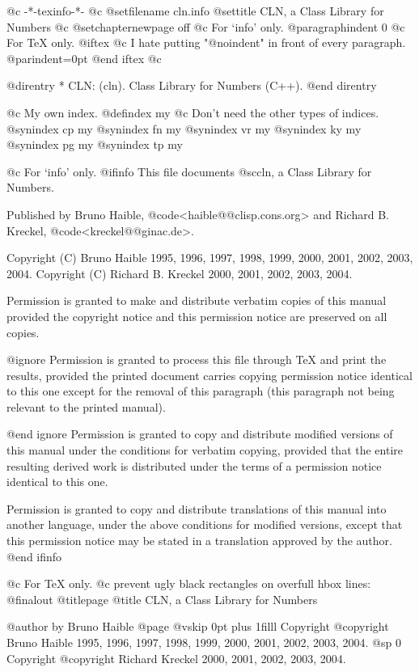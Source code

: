   @c -*-texinfo-*-
@c %
@setfilename cln.info
@settitle CLN, a Class Library for Numbers
@c @setchapternewpage off
@c For `info' only.
@paragraphindent 0
@c For TeX only.
@iftex
@c I hate putting "@noindent" in front of every paragraph.
@parindent=0pt
@end iftex
@c %

@direntry
* CLN: (cln).                       Class Library for Numbers (C++).
@end direntry

@c My own index.
@defindex my
@c Don't need the other types of indices.
@synindex cp my
@synindex fn my
@synindex vr my
@synindex ky my
@synindex pg my
@synindex tp my


@c For `info' only.
@ifinfo
This file documents @sc{cln}, a Class Library for Numbers.

Published by Bruno Haible, @code{<haible@@clisp.cons.org>} and
Richard B. Kreckel, @code{<kreckel@@ginac.de>}.

Copyright (C)  Bruno Haible 1995, 1996, 1997, 1998, 1999, 2000, 2001, 2002, 2003, 2004.
Copyright (C)  Richard B. Kreckel 2000, 2001, 2002, 2003, 2004.

Permission is granted to make and distribute verbatim copies of
this manual provided the copyright notice and this permission notice
are preserved on all copies.

@ignore
Permission is granted to process this file through TeX and print the
results, provided the printed document carries copying permission
notice identical to this one except for the removal of this paragraph
(this paragraph not being relevant to the printed manual).

@end ignore
Permission is granted to copy and distribute modified versions of this
manual under the conditions for verbatim copying, provided that the entire
resulting derived work is distributed under the terms of a permission
notice identical to this one.

Permission is granted to copy and distribute translations of this manual
into another language, under the above conditions for modified versions,
except that this permission notice may be stated in a translation approved
by the author.
@end ifinfo


@c For TeX only.
@c prevent ugly black rectangles on overfull hbox lines:
@finalout
@titlepage
@title CLN, a Class Library for Numbers

@author by Bruno Haible
@page
@vskip 0pt plus 1filll
Copyright @copyright{} Bruno Haible 1995, 1996, 1997, 1998, 1999, 2000, 2001, 2002, 2003, 2004.
@sp 0
Copyright @copyright{} Richard Kreckel 2000, 2001, 2002, 2003, 2004.

